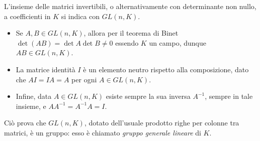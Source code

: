 L'insieme delle matrici invertibili, o alternativamente con determinante non nullo, a coefficienti in $K$ si indica con $GL(n,K)$.
\begin{itemize}
	\item Se $A,B\in GL(n,K)$, allora per il teorema di Binet $\det(AB)=\det A\det B\ne 0$ essendo $K$ un campo, dunque $AB\in GL(n,K)$.
	\item La matrice identità $I$ è un elemento neutro rispetto alla composizione, dato che $AI=IA=A$ per ogni $A\in GL(n,K)$.
	\item Infine, data $A\in GL(n,K)$ esiste sempre la sua inversa $A^{-1}$, sempre in tale insieme, e $AA^{-1}=A^{-1}A=I$.
\end{itemize}
Ciò prova che $GL(n,K)$, dotato dell'usuale prodotto righe per colonne tra matrici, è un gruppo: esso è chiamato \emph{gruppo generale lineare} di $K$.
